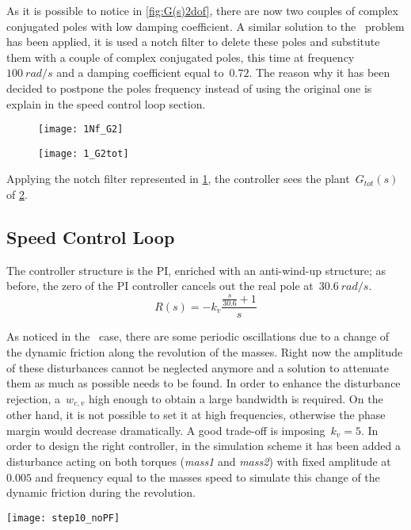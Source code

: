As it is possible to notice in \cref{fig:G(s)2dof}, there are now two couples of complex conjugated poles with low damping coefficient. A similar solution to the \onedof\ problem has been applied, it is used a notch filter to delete these poles and substitute them with a couple of complex conjugated poles, this time at frequency~$100\ rad/s$ and a damping coefficient equal to~$0.72$. The reason why it has been decided to postpone the poles frequency instead of using the original one is explain in the speed control loop section.


\begin{figure*}[h]
	\centering
	\begin{subfigure}{0.45\columnwidth}
		\texttt{[image: 1Nf\_G2]}
		\label{fig:Notch Filter2}
	\end{subfigure}
	\begin{subfigure}{0.45\columnwidth}
		\texttt{[image: 1\_G2tot]}
		\label{fig:Plant G(s) with Notch Filter2}
	\end{subfigure}
	\caption{Plant $G(s)$ with Notch Filter $N_f(s)$: $G_{tot}$(s)}
\end{figure*}


Applying the notch filter represented in \cref{fig:Notch Filter2}, the controller sees the plant~$G_{tot}(s)$ of \cref{fig:Plant G(s) with Notch Filter2}.

\newpage 
\subsection{Speed Control Loop}
The controller structure is the PI, enriched with an anti-wind-up structure; as before, the zero of the PI controller cancels out the real pole at~$30.6\ rad/s$.
\[
R(s)=-k_v
\frac{\frac{s}{30.6}+1}{s}
\]

As noticed in the \onedof~case, there are some periodic oscillations due to a change of the dynamic friction along the revolution of the masses. Right now the amplitude of these disturbances cannot be neglected anymore and a solution to attenuate them as much as possible needs to be found. In order to enhance the disturbance rejection, a~$w_{c,v}$ high enough to obtain a large bandwidth is required. On the other hand, it is not possible to set it at high frequencies, otherwise the phase margin would decrease dramatically. A good trade-off is imposing~$k_v=5$.
 In order to design the right controller, in the simulation scheme it has been added a disturbance acting on both torques (\textit{mass1} and \textit{mass2}) with fixed amplitude at~$0.005$ and frequency equal to the masses speed to simulate this change of the dynamic friction during the revolution.
\begin{figure*}[h]
	\centering
	\texttt{[image: step10\_noPF]}
	\caption{Step response with $k_v=5 $}
	\label{fig:step10_noPF}
\end{figure*}

